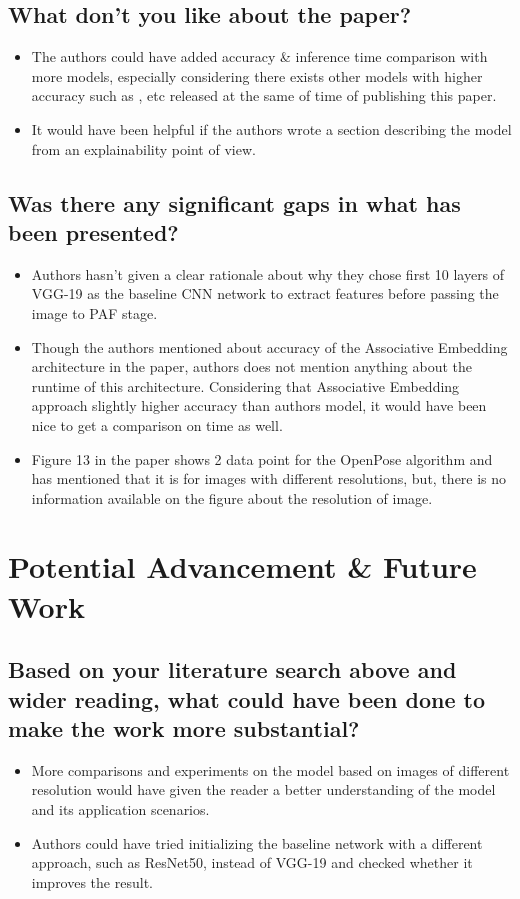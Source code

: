 \documentclass[twocolumn]{article}
\begin{document}
\subsection{What don't you like about the paper?}
\begin{itemize}
	\item The authors could have added accuracy \& inference time comparison with more models, especially considering there exists other models with higher accuracy such as \cite{ning2017knowledge},\cite{ke2018multi} etc released at the same of time of publishing this paper.
	\item It would have been helpful if the authors wrote a section describing the model from an explainability point of view.
\end{itemize}

\subsection{Was there any significant gaps in what has been presented?}
\begin{itemize}
	\item Authors hasn't given a clear rationale about why they chose first 10 layers of VGG-19 as the baseline CNN network to extract features before passing the image to PAF stage.
	\item Though the authors mentioned about accuracy of the Associative Embedding architecture\cite{newell2017associative} in the paper, authors does not mention anything about the runtime of this architecture. Considering that Associative Embedding approach slightly higher accuracy than authors model, it would have been nice to get a comparison on time as well.
	\item Figure 13 in the paper shows 2 data point for the OpenPose algorithm and has mentioned that it is for images with different resolutions, but, there is no information available on the figure about the resolution of image.
\end{itemize}


\section{Potential Advancement \& Future Work}


\subsection{Based on your literature search above and wider reading, what could have been done to make the work more substantial?}
\begin{itemize}
	\item More comparisons and experiments on the model based on images of different resolution would have given the reader a better understanding of the model and its application scenarios.
	\item Authors could have tried initializing the baseline network with a different approach, such as ResNet50, instead of VGG-19 and checked whether it improves the result.
\end{itemize}
\end{document}
